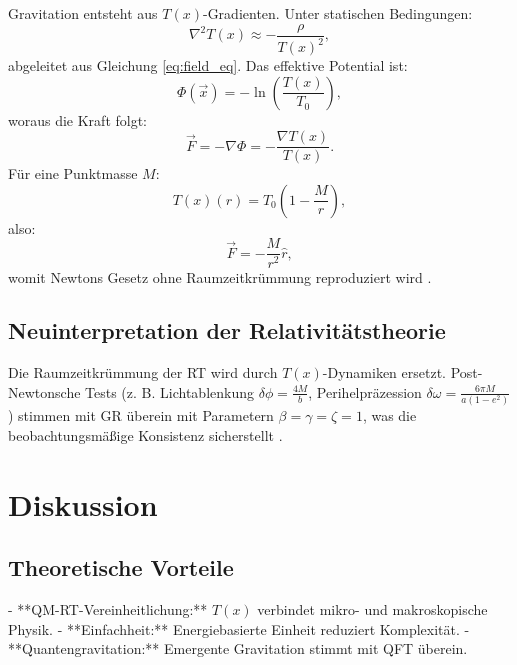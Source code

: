 \documentclass[12pt,a4paper]{article}
\newcommand{\Tfield}{T(x)}
\newcommand{\Tzero}{T_0}
\newcommand{\vecx}{\vec{x}}
\begin{document}
	Gravitation entsteht aus \(\Tfield\)-Gradienten. Unter statischen Bedingungen:
	\begin{equation}
		\nabla^2\Tfield \approx -\frac{\rho}{\Tfield^2},
		\label{eq:static_field}
	\end{equation}
	abgeleitet aus Gleichung \ref{eq:field_eq}. Das effektive Potential ist:
	\begin{equation}
		\Phi(\vecx) = -\ln\left(\frac{\Tfield}{\Tzero}\right),
		\label{eq:grav_potential_def}
	\end{equation}
	woraus die Kraft folgt:
	\begin{equation}
		\vec{F} = -\nabla\Phi = -\frac{\nabla\Tfield}{\Tfield}.
		\label{eq:force_from_potential}
	\end{equation}
	Für eine Punktmasse \(M\):
	\begin{equation}
		\Tfield(r) = \Tzero\left(1 - \frac{M}{r}\right),
		\label{eq:time_field_point_mass}
	\end{equation}
	also:
	\begin{equation}
		\vec{F} = -\frac{M}{r^2} \hat{r},
		\label{eq:newton_law}
	\end{equation}
	womit Newtons Gesetz ohne Raumzeitkrümmung reproduziert wird \cite{pascher_emergente_2025}.
	
	\subsection{Neuinterpretation der Relativitätstheorie}
	\label{subsec:rt_reinterpretation}
	
	Die Raumzeitkrümmung der RT wird durch \(\Tfield\)-Dynamiken ersetzt. Post-Newtonsche Tests (z. B. Lichtablenkung \(\delta\phi = \frac{4M}{b}\), Perihelpräzession \(\delta\omega = \frac{6\pi M}{a(1-e^2)}\)) stimmen mit GR überein mit Parametern \(\beta = \gamma = \zeta = 1\), was die beobachtungsmäßige Konsistenz sicherstellt \cite{Will2014}.
	
	\section{Diskussion}
	\label{sec:discussion}
	
	\subsection{Theoretische Vorteile}
	- **QM-RT-Vereinheitlichung:** \(\Tfield\) verbindet mikro- und makroskopische Physik.
	- **Einfachheit:** Energiebasierte Einheit reduziert Komplexität.
	- **Quantengravitation:** Emergente Gravitation stimmt mit QFT überein.
	
\end{document}

